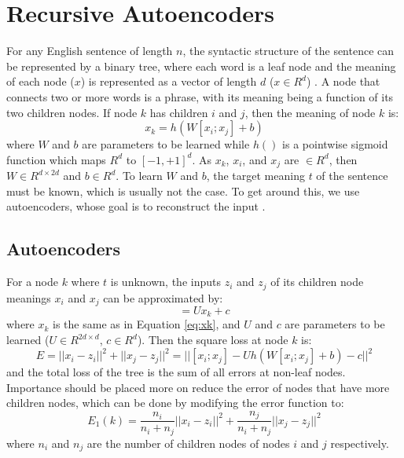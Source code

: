 \documentclass{article}
\begin{document}
\section{Recursive Autoencoders}
For any English sentence of length $n$, the syntactic structure of the sentence can be represented by a binary tree, where each word is a leaf node and the meaning of each node ($x$) is represented as a vector of length $d$ ($x \in R^d$) \cite{CSE250B}. A node that connects two or more words is a phrase, with its meaning being a function of its two children nodes. If node $k$ has children $i$ and $j$, then the meaning of node $k$ is:
\begin{equation}
    x_k = h(W[x_i ; x_j] + b)
    \label{eq:xk}
\end{equation}
where $W$ and $b$ are parameters to be learned while $h()$ is a pointwise sigmoid function which maps $R^d$ to $[-1, +1]^d$. As $x_k$, $x_i$, and $x_j$ are $\in R^d$, then $W \in R^{d \times 2d}$ and $b \in R^d$. To learn $W$ and $b$, the target meaning $t$ of the sentence must be known, which is usually not the case. To get around this, we use autoencoders, whose goal is to reconstruct the input \cite{CSE250B}.


%
%
\subsection{Autoencoders}
For a node $k$ where $t$ is unknown, the inputs $z_i$ and $z_j$ of its children node meanings $x_i$ and $x_j$ can be approximated by:
\begin{equation}
    [z_i ; z_j] = U x_k + c
\end{equation}
where $x_k$ is the same as in Equation \ref{eq:xk}, and $U$ and $c$ are parameters to be learned ($U \in R^{2d \times d}$, $c \in R^d$). Then the square loss at node $k$ is:
\begin{equation}
    E = ||x_i - z_i||^2 + ||x_j - z_j||^2 = || [x_i;x_j] - U h(W[x_i; x_j] + b) - c||^2
\end{equation}
and the total loss of the tree is the sum of all errors at non-leaf nodes. Importance should be placed more on reduce the error of nodes that have more children nodes, which can be done by modifying the error function to:
\begin{equation}
    E_1 (k) = \frac{n_i}{n_i + n_j} ||x_i - z_i||^2 + \frac{n_j}{n_i + n_j} ||x_j - z_j||^2
\end{equation}
where $n_i$ and $n_j$ are the number of children nodes of nodes $i$ and $j$ respectively.
\end{document}
